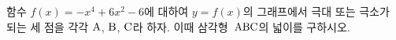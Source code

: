 함수 $f(x)=-x^4+6x^2-6$에 대하여 $y=f(x)$의 그래프에서 극대 또는 극소가 되는 세 점을 각각 $\mathrm{A}$, $\mathrm{B}$, $\mathrm{C}$라 하자. 이때 삼각형~$\mathrm{ABC}$의 넓이를 구하시오.
